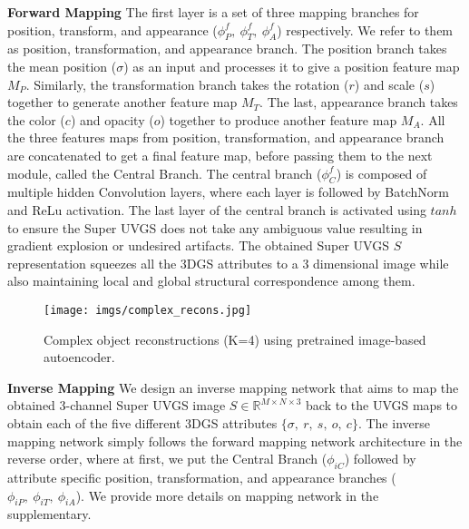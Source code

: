 \noindent\textbf{Forward Mapping}
The first layer is a set of three mapping branches for position, transform, and appearance ($\phi^f_{P}, ~\phi^f_{T}, ~\phi^f_{A}$) respectively. We refer to them as position, transformation, and appearance branch. 
The position branch takes the mean position ($\sigma$) as an input and processes it to give a position feature map $M_{P}$.
Similarly, the transformation branch takes the rotation ($r$) and scale ($s$) together to generate another feature map $M_{T}$.
The last, appearance branch takes the color ($c$) and opacity ($o$) together to produce another feature map $M_{A}$. 
All the three features maps from position, transformation, and appearance branch are concatenated to get a final feature map, before passing them to the next module, called the Central Branch. The central branch ($\phi^f_{C}$) is composed of multiple hidden Convolution layers, where each layer is followed by BatchNorm and ReLu activation.
The last layer of the central branch is activated using $tanh$ to ensure the Super UVGS does not take any ambiguous value resulting in gradient explosion or undesired artifacts. 
The obtained Super UVGS $S$ representation squeezes all the 3DGS attributes to a 3 dimensional image while also maintaining local and global structural correspondence among them. 
%

\begin{figure}[t]
\centering
\texttt{[image: imgs/complex\_recons.jpg]} 
\vspace{-0.3cm}
\caption{
Complex object reconstructions (K=4) using pretrained image-based autoencoder.
}
\vspace{-0.6cm}
\label{fig:complex_recons}
\end{figure}


\noindent\textbf{Inverse Mapping}
We design an inverse mapping network that aims to map the obtained 3-channel Super UVGS image $S \in \mathbb{R}^{M\times N \times 3}$ back to the UVGS maps to obtain each of the five different 3DGS attributes $\{ \sigma, ~r, ~s, ~o, ~c \}$. 
The inverse mapping network simply follows the forward mapping network architecture in the reverse order, where at first, we put the Central Branch ($\phi_{iC}$) followed by attribute specific position, transformation, and appearance branches ($\phi_{iP}, ~\phi_{iT}, ~\phi_{iA}$). We provide more details on mapping network in the supplementary.


